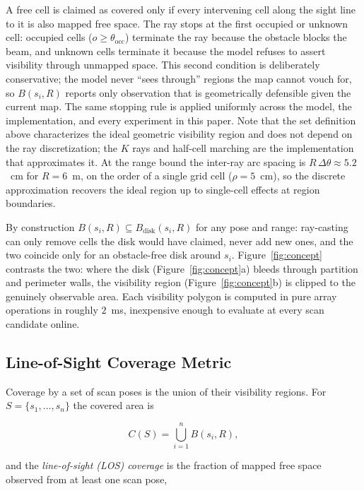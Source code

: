 \documentclass[sensors,article,submit,pdftex,moreauthors]{Definitions/mdpi}
\begin{document}
A free cell is claimed as covered only if every intervening cell along the sight
line to it is also mapped free space. The ray stops at the first occupied or
unknown cell: occupied cells ($o\ge\theta_{\mathrm{occ}}$) terminate the ray
because the obstacle blocks the beam, and unknown cells terminate it because the
model refuses to assert visibility through unmapped space. This second condition
is deliberately conservative; the model never ``sees through'' regions the map
cannot vouch for, so $B(s_i,R)$ reports only observation that is geometrically
defensible given the current map. The same stopping rule is applied uniformly
across the model, the implementation, and every experiment in this paper.
Note that the set definition above characterizes the ideal geometric
visibility region and does not depend on the ray discretization; the $K$ rays
and half-cell marching are the implementation that approximates it. At the
range bound the inter-ray arc spacing is $R\,\Delta\theta\approx5.2$~cm for
$R=6$~m, on the order of a single grid cell ($\rho=5$~cm), so the discrete
approximation recovers the ideal region up to single-cell effects at region
boundaries.

By construction $B(s_i,R)\subseteq B_{\mathrm{disk}}(s_i,R)$ for any pose and
range: ray-casting can only remove cells the disk would have claimed, never add
new ones, and the two coincide only for an obstacle-free disk around $s_i$.
Figure~\ref{fig:concept} contrasts the two: where the disk
(Figure~\ref{fig:concept}a) bleeds through partition and perimeter walls, the
visibility region (Figure~\ref{fig:concept}b) is clipped to the genuinely
observable area. Each visibility polygon is computed in pure array operations in
roughly $2$~ms, inexpensive enough to evaluate at every scan candidate online.

\subsection{Line-of-Sight Coverage Metric}
\label{sec:los}

Coverage by a set of scan poses is the union of their visibility regions. For
$S=\{s_1,\dots,s_n\}$ the covered area is

\begin{equation}
C(S)=\bigcup_{i=1}^{n} B(s_i,R),
\end{equation}

and the \emph{line-of-sight (LOS) coverage} is the fraction of mapped free space
observed from at least one scan pose,
\end{document}
